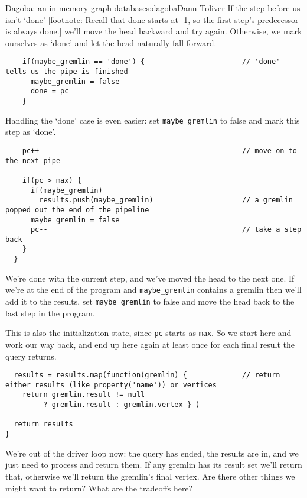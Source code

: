 \begin{aosachapter}{Dagoba: an in-memory graph database}{s:dagoba}{Dann Toliver}
If the step before us isn't `done' {[}footnote: Recall that done starts
at -1, so the first step's predecessor is always done.{]} we'll move the
head backward and try again. Otherwise, we mark ourselves as `done' and
let the head naturally fall forward.

\begin{verbatim}
    if(maybe_gremlin == 'done') {                       // 'done' tells us the pipe is finished
      maybe_gremlin = false
      done = pc
    }    
\end{verbatim}

Handling the `done' case is even easier: set \texttt{maybe\_gremlin} to
false and mark this step as `done'.

\begin{verbatim}
    pc++                                                // move on to the next pipe
    
    if(pc > max) {
      if(maybe_gremlin)
        results.push(maybe_gremlin)                     // a gremlin popped out the end of the pipeline
      maybe_gremlin = false
      pc--                                              // take a step back
    }
  }
\end{verbatim}

We're done with the current step, and we've moved the head to the next
one. If we're at the end of the program and \texttt{maybe\_gremlin}
contains a gremlin then we'll add it to the results, set
\texttt{maybe\_gremlin} to false and move the head back to the last step
in the program.

This is also the initialization state, since \texttt{pc} starts as
\texttt{max}. So we start here and work our way back, and end up here
again at least once for each final result the query returns.

\begin{verbatim}
  results = results.map(function(gremlin) {             // return either results (like property('name')) or vertices
    return gremlin.result != null 
         ? gremlin.result : gremlin.vertex } )

  return results
}
\end{verbatim}

We're out of the driver loop now: the query has ended, the results are
in, and we just need to process and return them. If any gremlin has its
result set we'll return that, otherwise we'll return the gremlin's final
vertex. Are there other things we might want to return? What are the
tradeoffs here?


\end{aosachapter}
